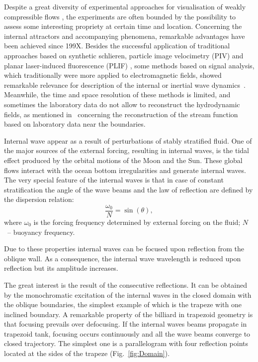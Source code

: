 \documentclass[a4wide,fontsize=12pt]{article}
\begin{document}
Despite a great diversity of experimental approaches for visualisation of weakly compressible flows \cite{znamenskaya2021methods388562176,2014SutherlandDuaxoisPeacockIWinLE}, the experiments are often bounded by the possibility to assess some interesting propriety at certain time and location. Concerning the internal attractors and accompanying phenomena, remarkable advantages have been achieved since 199X. Besides the successful application of traditional approaches based on synthetic schlieren, particle image velocimetry (PIV) and planar laser-induced fluorescence (PLIF) , some methods based on signal analysis, which traditionally were more applied to electromagnetic fields, showed remarkable relevance for description of the internal or inertial wave dynamics~\cite{2013BourgetDauxoisJoubaudOdier,2016DossmannBourgetBrouzetDauxoisJoubaudOdier,2019DavisDauxoisJaminJoubaud,2020HusseiniVarmaDauxoisJoubaudOdierMathur}. Meanwhile, the time and space resolution of these methods is limited, and sometimes the laboratory data do not allow to reconstruct the hydrodynamic fields, as mentioned in~\cite{2014LeePaolettiSwinneyMorrisonExperDeterIWpower} concerning the reconstruction of the stream function based on laboratory data near the boundaries.

Internal wave appear as a result of perturbations of stably stratified fluid. 
One of the major sources of the external forcing, resulting in internal waves, is the tidal effect produced by the orbital motions of the Moon and the Sun. These global flows interact with the ocean bottom irregularities and generate internal waves. The very special feature of the internal waves is that in case of constant stratification the angle of the wave beams and the law of reflection are defined by the dispersion relation:
\begin{equation}
\frac{\omega_0}{N} = \sin(\theta),
\label{eq:DispRel}
\end{equation}
where $\omega_0$ is the forcing frequency determined by external forcing on the fluid; 
$N$~-- buoyancy frequency.


Due to these properties internal waves can be focused upon reflection from the oblique wall. As a consequence,  the internal wave wavelength is reduced upon reflection but its amplitude increases.


The great interest is the result of the consecutive reflections. It can be obtained by the monochromatic excitation of the internal waves in the closed domain with the oblique boundaries, the simplest example of which is the trapeze with one inclined boundary.
A remarkable property of the billiard in trapezoid geometry is that focusing prevails over defocusing.
If the internal waves beams propagate in trapezoid tank, focusing occurs continuously and all the wave beams converge to closed trajectory.  The simplest one is a parallelogram with four reflection points located at the sides of the trapeze (Fig.~\ref{fig:Domain}).
\end{document}
